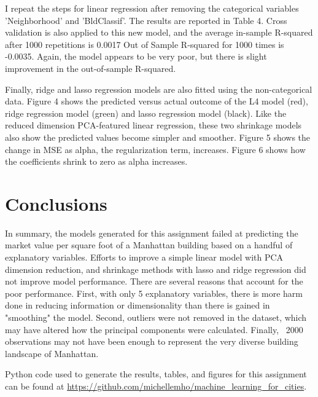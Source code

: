 \documentclass[10pt,twocolumn]{article}
\begin{document}
I repeat the steps for linear regression after removing the categorical variables 'Neighborhood'
and 'BldClassif'. The results are reported in Table 4. Cross validation is also applied to this
new model, and the average in-sample R-squared after 1000 repetitions is 0.0017
Out of Sample R-squared for 1000 times is -0.0035. Again, the model appears to be
very poor, but there is slight improvement in the out-of-sample R-squared.

Finally, ridge and lasso regression models are also fitted using the non-categorical data. Figure
4 shows the predicted versus actual outcome of the L4 model (red), ridge regression model
(green) and lasso regression model (black). Like the reduced dimension PCA-featured
linear regression, these two shrinkage models also show the predicted values
become simpler and smoother. Figure 5 shows the change in MSE as alpha, the regularization term,
increases. Figure 6 shows how the coefficients shrink to zero as alpha increases.

\section{Conclusions}

In summary, the models generated for this assignment failed at predicting
the market value per square foot of a Manhattan building based on a handful of
explanatory variables. Efforts to improve a simple linear model with PCA dimension reduction,
and shrinkage methods with lasso and ridge regression did not improve model performance.
There are several reasons that account for the poor performance. First, with only
5 explanatory variables, there is more harm done in reducing information or dimensionality than
there is gained in "smoothing" the model. Second, outliers were not removed in
the dataset, which may have altered how the principal components were calculated.
Finally, ~2000 observations may not have been enough to represent the very diverse
building landscape of Manhattan.

Python code used to generate the results, tables, and figures for this assignment can be
found at \url{https://github.com/michellemho/machine_learning_for_cities}.
\end{document}
